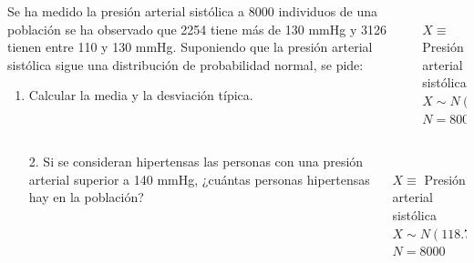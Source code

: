 \documentclass[aspectratio=149,10pt,t]{beamer}
\begin{document}
\begin{frame}
	\begin{columns}
		\begin{column}[T]{0.7\textwidth}
			Se ha medido la presión arterial sistólica a 8000 individuos de una población se ha observado que 2254 tiene más de 130 mmHg y 3126 tienen entre 110 y 130 mmHg.
			Suponiendo que la presión arterial sistólica sigue una distribución de probabilidad normal, se pide:
			\begin{enumerate}
			  \item Calcular la media y la desviación típica.
			\end{enumerate}
		\end{column}
		\begin{column}[T]{0.3\textwidth}
			\\
			$X\equiv$ Presión arterial sistólica\\
			$X\sim N(\mu,\sigma)$\\
			$N=8000$
		\end{column}
	\end{columns}
\end{frame}


\begin{frame}
	\begin{columns}
		\begin{column}[T]{0.7\textwidth}
			\begin{enumerate}
			  \item[2.] Si se consideran hipertensas las personas con una presión arterial superior a 140 mmHg, ¿cuántas personas hipertensas hay en la población?
			\end{enumerate}
		\end{column}
		\begin{column}[T]{0.3\textwidth}
			\structure{Datos}\\
			$X\equiv$ Presión arterial sistólica\\
			$X\sim N(118.7,\,19.42)$\\
			$N=8000$
		\end{column}
	\end{columns}
\end{frame}
\end{document}
